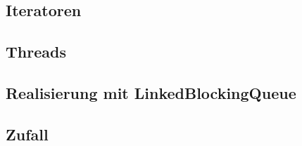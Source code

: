 
\subsection{Iteratoren} %
\label{sub:iterators}


\subsection{Threads} %
\label{sub:die_klasse_thread}


\subsection{Realisierung mit LinkedBlockingQueue} %
\label{sub:realisierung_mit_linkedblockingqueue}


\subsection{Zufall} %
\label{sub:zufall}


